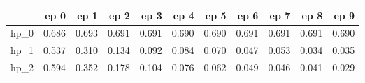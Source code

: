 \begin{tabular}{lrrrrrrrrrr}
\toprule
{} &   ep 0 &   ep 1 &   ep 2 &   ep 3 &   ep 4 &   ep 5 &   ep 6 &   ep 7 &   ep 8 &   ep 9 \\
\midrule
hp\_0 &  0.686 &  0.693 &  0.691 &  0.691 &  0.690 &  0.690 &  0.691 &  0.691 &  0.691 &  0.690 \\
hp\_1 &  0.537 &  0.310 &  0.134 &  0.092 &  0.084 &  0.070 &  0.047 &  0.053 &  0.034 &  0.035 \\
hp\_2 &  0.594 &  0.352 &  0.178 &  0.104 &  0.076 &  0.062 &  0.049 &  0.046 &  0.041 &  0.029 \\
\bottomrule
\end{tabular}
